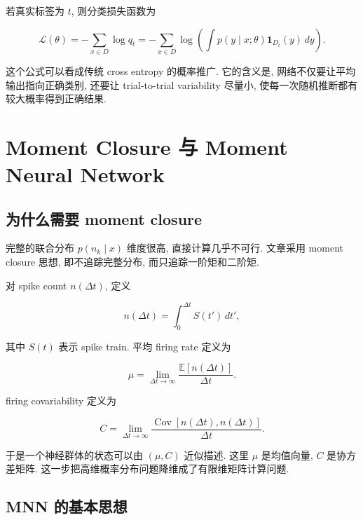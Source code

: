 \documentclass[oneside]{ctexart}
\begin{document}
若真实标签为 $t$, 则分类损失函数为

\begin{equation}
    \mathcal{L}(\theta)
    =
    -\sum\limits_{x\in D}\log q_t
    =
    -\sum\limits_{x\in D}
    \log
    \left(
    \int\limits p(y\mid x;\theta)\mathbf{1}_{D_t}(y)\,dy
    \right).
\end{equation}

这个公式可以看成传统 cross entropy 的概率推广. 它的含义是, 网络不仅要让平均输出指向正确类别, 还要让 trial-to-trial variability 尽量小, 使每一次随机推断都有较大概率得到正确结果.

\section{Moment Closure 与 Moment Neural Network}

\subsection{为什么需要 moment closure}

完整的联合分布 $p(n_k\mid x)$ 维度很高, 直接计算几乎不可行. 文章采用 moment closure 思想, 即不追踪完整分布, 而只追踪一阶矩和二阶矩.

对 spike count $n(\Delta t)$, 定义

\begin{equation}
    n(\Delta t)
    =
    \int_0^{\Delta t}S(t')\,dt',
\end{equation}

其中 $S(t)$ 表示 spike train. 平均 firing rate 定义为

\begin{equation}
    \mu
    =
    \lim\limits_{\Delta t\to\infty}
    \dfrac{\mathbb{E}[n(\Delta t)]}{\Delta t}.
\end{equation}

firing covariability 定义为

\begin{equation}
    C
    =
    \lim\limits_{\Delta t\to\infty}
    \dfrac{\operatorname{Cov}[n(\Delta t),n(\Delta t)]}{\Delta t}.
\end{equation}

于是一个神经群体的状态可以由 $(\mu,C)$ 近似描述. 这里 $\mu$ 是均值向量, $C$ 是协方差矩阵. 这一步把高维概率分布问题降维成了有限维矩阵计算问题.

\subsection{MNN 的基本思想}
\end{document}
